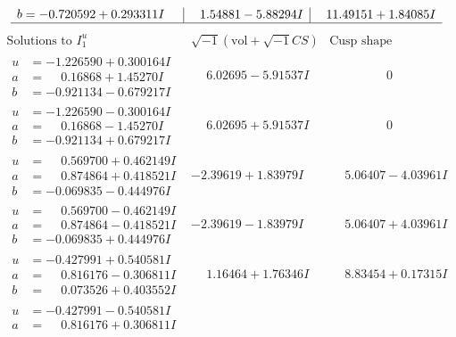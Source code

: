\documentclass[1p]{elsarticle_modified}
\theoremstyle{definition}
\newcommand{\I}{\sqrt{-1}}
\begin{document}
$$\begin{array}{c|c|c}
\begin{aligned}
b &= -0.720592 + 0.293311 I\end{aligned}
 & \phantom{-}1.54881 - 5.88294 I & \phantom{-}11.49151 + 1.84085 I\\
 \hline 
 \end{array}$$\newpage$$\begin{array}{c|c|c}  
\text{Solutions to }I^u_{1}& \I (\text{vol} + \sqrt{-1}CS) & \text{Cusp shape}\\
 \hline 
\begin{aligned}
u &= -1.226590 + 0.300164 I \\
a &= \phantom{-}0.16868 + 1.45270 I \\
b &= -0.921134 - 0.679217 I\end{aligned}
 & \phantom{-}6.02695 - 5.91537 I & \phantom{-0.000000 } 0 \\ \hline\begin{aligned}
u &= -1.226590 - 0.300164 I \\
a &= \phantom{-}0.16868 - 1.45270 I \\
b &= -0.921134 + 0.679217 I\end{aligned}
 & \phantom{-}6.02695 + 5.91537 I & \phantom{-0.000000 } 0 \\ \hline\begin{aligned}
u &= \phantom{-}0.569700 + 0.462149 I \\
a &= \phantom{-}0.874864 + 0.418521 I \\
b &= -0.069835 - 0.444976 I\end{aligned}
 & -2.39619 + 1.83979 I & \phantom{-}5.06407 - 4.03961 I \\ \hline\begin{aligned}
u &= \phantom{-}0.569700 - 0.462149 I \\
a &= \phantom{-}0.874864 - 0.418521 I \\
b &= -0.069835 + 0.444976 I\end{aligned}
 & -2.39619 - 1.83979 I & \phantom{-}5.06407 + 4.03961 I \\ \hline\begin{aligned}
u &= -0.427991 + 0.540581 I \\
a &= \phantom{-}0.816176 - 0.306811 I \\
b &= \phantom{-}0.073526 + 0.403552 I\end{aligned}
 & \phantom{-}1.16464 + 1.76346 I & \phantom{-}8.83454 + 0.17315 I \\ \hline\begin{aligned}
u &= -0.427991 - 0.540581 I \\
a &= \phantom{-}0.816176 + 0.306811 I \\

\end{aligned}
\end{array}$$
\end{document}

